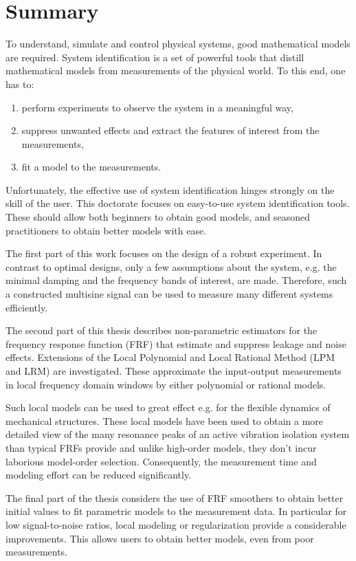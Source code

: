 \chapter{Summary}
To understand, simulate and control physical systems, good mathematical models are required. 
System identification is a set of powerful tools that distill mathematical models from measurements of the physical world. 
To this end, one has to:
\begin{enumerate}
\item perform experiments to observe the system in a meaningful way,
\item suppress unwanted effects and extract the features of interest from the measurements,
\item fit a model to the measurements.
\end{enumerate}

Unfortunately, the effective use of system identification hinges strongly on the skill of the user. This doctorate focuses on easy-to-use system identification tools. 
These should allow both beginners to obtain good models, and seasoned practitioners to obtain better models with ease.

The first part of this work focuses on the design of a robust experiment. 
In contrast to optimal designs, only a few assumptions about the system, e.g. the minimal damping and the frequency bands of interest, are made. 
Therefore, such a constructed multisine signal can be used to measure many different systems efficiently.

The second part of this thesis describes non-parametric estimators for the frequency response function (FRF) that estimate and suppress leakage and noise effects. 
Extensions of the Local Polynomial and Local Rational Method (LPM and LRM) are investigated. These approximate the input-output measurements in local frequency domain windows by either polynomial or rational models.

Such local models can be used to great effect e.g. for the flexible dynamics of mechanical structures.
 These local models have been used to obtain a more detailed view of the many resonance peaks of an active vibration isolation system than typical FRFs provide and unlike high-order models, they don’t incur laborious model-order selection.
Consequently, the measurement time and modeling effort can be reduced significantly.

The final part of the thesis considers the use of FRF smoothers to obtain better initial values to fit parametric models to the measurement data. 
In particular for low signal-to-noise ratios, local modeling or regularization provide a considerable improvements. 
This allows users to obtain better models, even from poor measurements.
